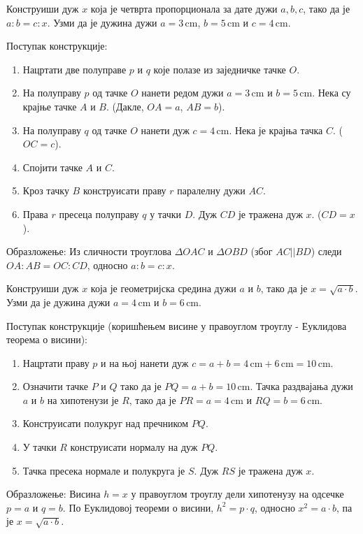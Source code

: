 \documentclass[11pt,a5paper,addpoints]{exam}
\def\measure#1#2{#1 \, \mathrm{#2}}
\begin{document}
\begin{questions}
\question[3]
 Конструиши дуж $x$ која је четврта пропорционала за дате дужи $a, b, c$, тако да је $a:b=c:x$. Узми да је дужина дужи $a=\measure{3}{cm}$, $b=\measure{5}{cm}$ и $c=\measure{4}{cm}$.
 \begin{solution}[\stretch 7] %
  Поступак конструкције:
  \begin{enumerate}
      \item Нацртати две полуправе $p$ и $q$ које полазе из заједничке тачке $O$.
      \item На полуправу $p$ од тачке $O$ нанети редом дужи $a=\measure{3}{cm}$ и $b=\measure{5}{cm}$. Нека су крајње тачке $A$ и $B$. (Дакле, $OA=a$, $AB=b$).
      \item На полуправу $q$ од тачке $O$ нанети дуж $c=\measure{4}{cm}$. Нека је крајња тачка $C$. ($OC=c$).
      \item Спојити тачке $A$ и $C$.
      \item Кроз тачку $B$ конструисати праву $r$ паралелну дужи $AC$.
      \item Права $r$ пресеца полуправу $q$ у тачки $D$. Дуж $CD$ је тражена дуж $x$. ($CD=x$).
  \end{enumerate}
  Образложење: Из сличности троуглова $\Delta OAC$ и $\Delta OBD$ (због $AC || BD$) следи $OA:AB = OC:CD$, односно $a:b=c:x$.
 \end{solution}
 \answerline

\ifprintanswers\else\newpage\fi %

\question[3]
 Конструиши дуж $x$ која је геометријска средина дужи $a$ и $b$, тако да је $x = \sqrt{a \cdot b}$. Узми да је дужина дужи $a=\measure{4}{cm}$ и $b=\measure{6}{cm}$.
 \begin{solution}[\stretch 7] %
  Поступак конструкције (коришћењем висине у правоуглом троуглу - Еуклидова теорема о висини):
  \begin{enumerate}
      \item Нацртати праву $p$ и на њој нанети дуж $c = a+b = 4\,\mathrm{cm} + 6\,\mathrm{cm} = 10\,\mathrm{cm}$.
      \item Означити тачке $P$ и $Q$ тако да је $PQ = a+b = 10\,\mathrm{cm}$. Тачка раздвајања дужи $a$ и $b$ на хипотенузи је $R$, тако да је $PR = a = 4\,\mathrm{cm}$ и $RQ = b = 6\,\mathrm{cm}$.
      \item Конструисати полукруг над пречником $PQ$.
      \item У тачки $R$ конструисати нормалу на дуж $PQ$.
      \item Тачка пресека нормале и полукруга је $S$. Дуж $RS$ је тражена дуж $x$.
  \end{enumerate}
  Образложење: Висина $h=x$ у правоуглом троуглу дели хипотенузу на одсечке $p=a$ и $q=b$. По Еуклидовој теореми о висини, $h^2 = p \cdot q$, односно $x^2 = a \cdot b$, па је $x = \sqrt{a \cdot b}$.
 \end{solution}
 \answerline


\end{questions}
\end{document}
